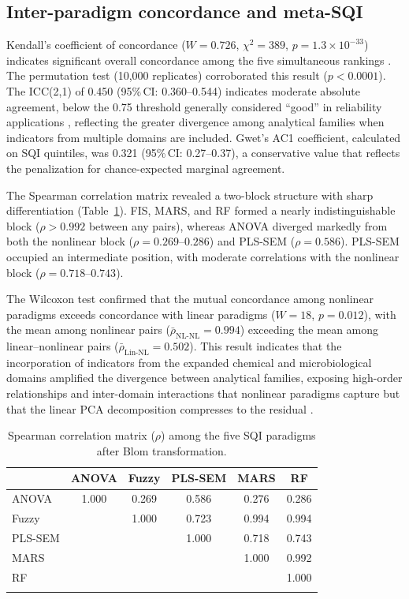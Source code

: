 \documentclass[pdflatex,sn-basic]{sn-jnl}%
\begin{document}
\subsection{Inter-paradigm concordance and meta-SQI}\label{subsec:concordance_disc}

Kendall's coefficient of concordance ($W = 0.726$, $\chi^2 = 389$, $p = 1.3 \times 10^{-33}$) indicates significant overall concordance among the five simultaneous rankings \citep{Legendre2012}. The permutation test (10,000 replicates) corroborated this result ($p < 0.0001$). The ICC(2,1) of 0.450 (95\%\,CI: 0.360--0.544) indicates moderate absolute agreement, below the 0.75 threshold generally considered ``good'' in reliability applications \citep{Koo2016}, reflecting the greater divergence among analytical families when indicators from multiple domains are included. Gwet's AC1 coefficient, calculated on SQI quintiles, was 0.321 (95\%\,CI: 0.27--0.37), a conservative value that reflects the penalization for chance-expected marginal agreement.

The Spearman correlation matrix revealed a two-block structure with sharp differentiation (Table~\ref{tab:spearman}). FIS, MARS, and RF formed a nearly indistinguishable block ($\rho > 0.992$ between any pairs), whereas ANOVA diverged markedly from both the nonlinear block ($\rho = 0.269$--$0.286$) and PLS-SEM ($\rho = 0.586$). PLS-SEM occupied an intermediate position, with moderate correlations with the nonlinear block ($\rho = 0.718$--$0.743$).

The Wilcoxon test confirmed that the mutual concordance among nonlinear paradigms exceeds concordance with linear paradigms ($W = 18$, $p = 0.012$), with the mean among nonlinear pairs ($\bar{\rho}_{\text{NL-NL}} = 0.994$) exceeding the mean among linear--nonlinear pairs ($\bar{\rho}_{\text{Lin-NL}} = 0.502$). This result indicates that the incorporation of indicators from the expanded chemical and microbiological domains amplified the divergence between analytical families, exposing high-order relationships and inter-domain interactions that nonlinear paradigms capture but that the linear PCA decomposition compresses to the residual \citep{Zeraatpisheh2020}.

\begin{table}[ht]
\caption{Spearman correlation matrix ($\rho$) among the five SQI paradigms after Blom transformation.}\label{tab:spearman}
\begin{tabular*}{\textwidth}{@{\extracolsep\fill}lccccc}
\toprule
 & ANOVA & Fuzzy & PLS-SEM & MARS & RF \\
\midrule
ANOVA   & 1.000 & 0.269 & 0.586 & 0.276 & 0.286 \\
Fuzzy   &       & 1.000 & 0.723 & 0.994 & 0.994 \\
PLS-SEM &       &       & 1.000 & 0.718 & 0.743 \\
MARS    &       &       &       & 1.000 & 0.992 \\
RF      &       &       &       &       & 1.000 \\
\botrule
\end{tabular*}
\end{table}
\end{document}
